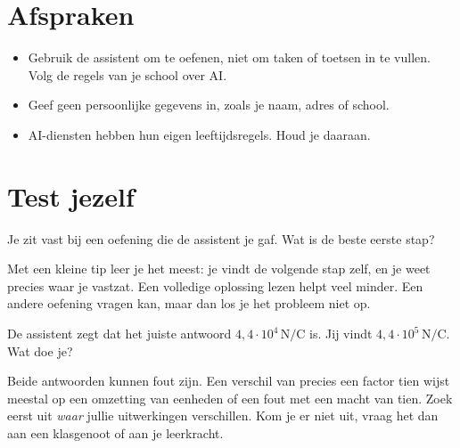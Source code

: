 \documentclass{ximera}
\begin{document}
\section{Afspraken}\label{sec:ai-afspraken}
\begin{itemize}
    \item Gebruik de assistent om te oefenen, niet om taken of toetsen in te vullen. Volg de regels van je school over AI.
    \item Geef geen persoonlijke gegevens in, zoals je naam, adres of school.
    \item AI-diensten hebben hun eigen leeftijdsregels. Houd je daaraan.
\end{itemize}

\section{Test jezelf}\label{sec:ai-quiz}
\begin{question}
    Je zit vast bij een oefening die de assistent je gaf. Wat is de beste eerste stap?

    \begin{multipleChoice}
    \end{multipleChoice}

    \begin{solution}\nl
        Met een kleine tip leer je het meest: je vindt de volgende stap zelf, en je weet precies waar je vastzat. Een volledige oplossing lezen helpt veel minder. Een andere oefening vragen kan, maar dan los je het probleem niet op.
    \end{solution}
\end{question}

\begin{question}
    De assistent zegt dat het juiste antwoord $4{,}4 \cdot 10^{4} \, \mathrm{N/C}$ is. Jij vindt $4{,}4 \cdot 10^{5} \, \mathrm{N/C}$. Wat doe je?

    \begin{multipleChoice}
    \end{multipleChoice}

    \begin{solution}\nl
        Beide antwoorden kunnen fout zijn. Een verschil van precies een factor tien wijst meestal op een omzetting van eenheden of een fout met een macht van tien. Zoek eerst uit \emph{waar} jullie uitwerkingen verschillen. Kom je er niet uit, vraag het dan aan een klasgenoot of aan je leerkracht.
    \end{solution}
\end{question}
\end{document}

